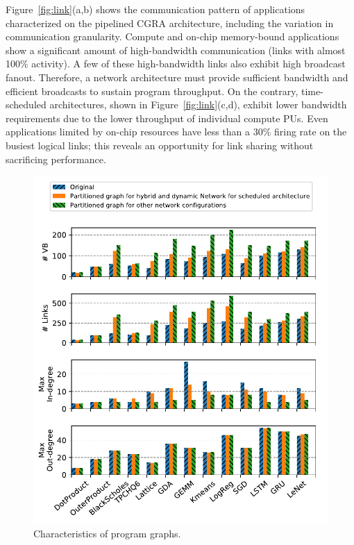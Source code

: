 Figure~\ref{fig:link}(a,b) shows the communication pattern of applications
characterized on the pipelined CGRA architecture, including the variation in communication granularity. 
Compute and on-chip memory-bound applications show a significant amount of high-bandwidth communication (links with almost 100\% activity). 
A few of these high-bandwidth links also exhibit high broadcast fanout. 
Therefore, a network architecture must provide sufficient bandwidth and efficient broadcasts to sustain program throughput.
On the contrary, time-scheduled architectures, shown in Figure~\ref{fig:link}(c,d), exhibit
lower bandwidth requirements due to the lower throughput of individual compute PUs. 
Even applications limited by on-chip resources have less than a 30\% firing rate on the busiest logical links; this reveals an opportunity for link sharing without sacrificing performance.

\begin{figure}
\centering
\includegraphics[width=0.9\columnwidth]{network/figs/graph.pdf}
\caption{Characteristics of program graphs.}\label{fig:graph}
\end{figure}

